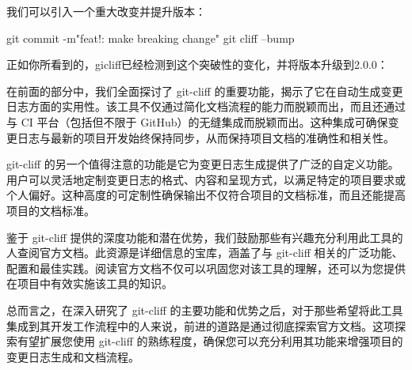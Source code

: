 我们可以引入一个重大改变并提升版本：

\begin{shell}
git commit -m"feat!: make breaking change"
git cliff --bump
\end{shell}

正如你所看到的，gicliff已经检测到这个突破性的变化，并将版本升级到2.0.0：


在前面的部分中，我们全面探讨了 git-cliff 的重要功能，揭示了它在自动生成变更日志方面的实用性。该工具不仅通过简化文档流程的能力而脱颖而出，而且还通过与 CI 平台（包括但不限于 GitHub）的无缝集成而脱颖而出。这种集成可确保变更日志与最新的项目开发始终保持同步，从而保持项目文档的准确性和相关性。

git-cliff 的另一个值得注意的功能是它为变更日志生成提供了广泛的自定义功能。用户可以灵活地定制变更日志的格式、内容和呈现方式，以满足特定的项目要求或个人偏好。这种高度的可定制性确保输出不仅符合项目的文档标准，而且还能提高项目的文档标准。

鉴于 git-cliff 提供的深度功能和潜在优势，我们鼓励那些有兴趣充分利用此工具的人查阅官方文档。此资源是详细信息的宝库，涵盖了与 git-cliff 相关的广泛功能、配置和最佳实践。阅读官方文档不仅可以巩固您对该工具的理解，还可以为您提供在项目中有效实施该工具的知识。

总而言之，在深入研究了 git-cliff 的主要功能和优势之后，对于那些希望将此工具集成到其开发工作流程中的人来说，前进的道路是通过彻底探索官方文档。这项探索有望扩展您使用 git-cliff 的熟练程度，确保您可以充分利用其功能来增强项目的变更日志生成和文档流程。













